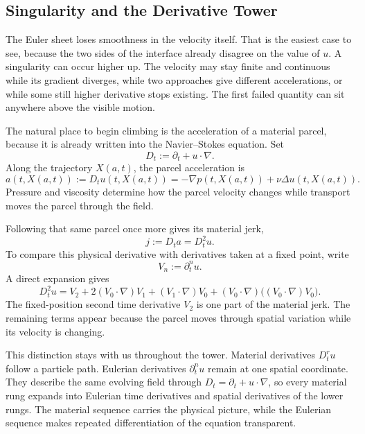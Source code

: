 \subsection{Singularity and the Derivative Tower}\label{sub:SingularityAndTheDerivativeTower}

The Euler sheet loses smoothness in the velocity itself.
That is the easiest case to see, because the two sides of the interface already disagree on the value of \(u\).
A singularity can occur higher up.
The velocity may stay finite and continuous while its gradient diverges, while two approaches give different accelerations, or while some still higher derivative stops existing.
The first failed quantity can sit anywhere above the visible motion.

The natural place to begin climbing is the acceleration of a material parcel, because it is already written into the Navier--Stokes equation.
Set
\[
  D_t:=\partial_t+u\cdot\nabla.
\]
Along the trajectory \(X(a,t)\), the parcel acceleration is
\[
  a(t,X(a,t))
  :=
  D_tu(t,X(a,t))
  =
  -\nabla p(t,X(a,t))
  +\nu\Delta u(t,X(a,t)).
\]
Pressure and viscosity determine how the parcel velocity changes while transport moves the parcel through the field.

Following that same parcel once more gives its material jerk,
\[
  j:=D_ta=D_t^2u.
\]
To compare this physical derivative with derivatives taken at a fixed point, write
\[
  V_n:=\partial_t^n u.
\]
A direct expansion gives
\[
  D_t^2u
  =
  V_2
  +2(V_0\cdot\nabla)V_1
  +(V_1\cdot\nabla)V_0
  +(V_0\cdot\nabla)\bigl((V_0\cdot\nabla)V_0\bigr).
\]
The fixed-position second time derivative \(V_2\) is one part of the material jerk.
The remaining terms appear because the parcel moves through spatial variation while its velocity is changing.

This distinction stays with us throughout the tower.
Material derivatives \(D_t^ru\) follow a particle path.
Eulerian derivatives \(\partial_t^nu\) remain at one spatial coordinate.
They describe the same evolving field through \(D_t=\partial_t+u\cdot\nabla\), so every material rung expands into Eulerian time derivatives and spatial derivatives of the lower rungs.
The material sequence carries the physical picture, while the Eulerian sequence makes repeated differentiation of the equation transparent.

